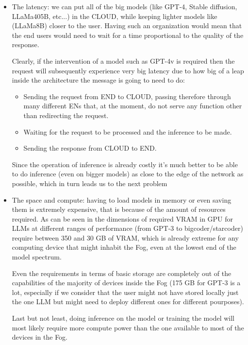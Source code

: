 \begin{itemize}
	\item The latency: we can put all of the big models (like GPT-4, Stable diffusion, LLaMa405B,
	      etc...) in the CLOUD, while keeping lighter models like (LLaMa8B) closer to the
	      user. Having such an organization would mean that the end users would need to wait for a
	      time proportional to the quality of the response.

	      Clearly, if the intervention of a model such as GPT-4v is required then the request will
	      subsequently experience very big latency due to how big of a leap inside the architecture
	      the message is going to need to do:
	      \begin{itemize}
		      \item Sending the request from END to CLOUD, passing therefore through many
		            different ENs that, at the moment, do not serve any function other
		            than redirecting the request.
		      \item Waiting for the request to be processed and the inference to be made.
		      \item Sending the response from CLOUD to END.
	      \end{itemize}
	      Since the operation of inference is already costly it's much better to be able to do
	      inference (even on bigger models) as close to the edge of the network as possible, which
	      in turn leads us to the next problem

	\item The space and compute: having to load models in memory or even saving them is
	      extremely expensive, that is because of the amount of resources required.
	      As can be seen in \cite{hug-optimization} the dimensions of required VRAM in GPU for LLMs at
	      different ranges of performance (from GPT-3 to bigcoder/starcoder) require between 350 and
	      30 GB of VRAM, which is already extreme for any computing device that might inhabit the
	      Fog, even at the lowest end of the model spectrum.

	      Even the requirements in terms of basic storage are completely out of the capabilities of
	      the majority of devices inside the Fog (175 GB for GPT-3 is a lot, especially if we consider
	      that the user might not have stored locally just the one LLM but might need to deploy
	      different ones for different pourposes).

	      Last but not least, doing inference on the model or training the model will most likely
	      require more compute power than the one available to most of the devices in the Fog.
\end{itemize}

